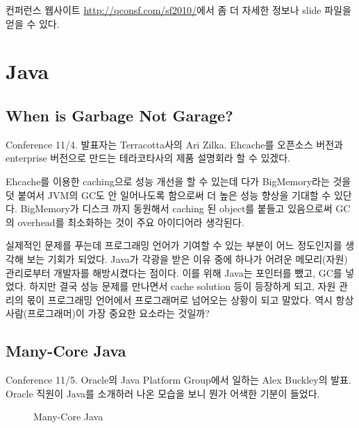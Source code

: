 \documentclass[11pt]{article}
\begin{document}
컨퍼런스 웹사이트 \url{http://qconsf.com/sf2010/}에서 좀 더 자세한 정보나 
slide 파일을 얻을 수 있다.


\section{Java}

\subsection{When is Garbage Not Garage?}
\label{sec:gc}

Conference 11/4. 발표자는 Terracotta사의 Ari Zilka.
Ehcache를 오픈소스 버전과 enterprise 버전으로 만드는 테라코타사의 제품 
설명회라 할 수 있겠다.
 
Ehcache를 이용한 caching으로 성능 개선을 할 수 있는데 다가
BigMemory라는 것을 덧 붙여서 JVM의 GC도 안 일어나도록 함으로써 더 높은
성능 향상을 기대할 수 있단다.
BigMemory가 디스크 까지 동원해서 caching 된 object를 붙들고 있음으로써
GC의 overhead를 최소화하는 것이 주요 아이디어라 생각된다.
 
실제적인 문제를 푸는데 프로그래밍 언어가 기여할 수 있는 부분이 어느 
정도인지를 생각해 보는 기회가 되었다.
Java가 각광을 받은 이유 중에 하나가 어려운 메모리(자원) 관리로부터 개발자를 
해방시켰다는 점이다. 이를 위해 Java는 포인터를 뺐고, GC를 넣었다. 
하지만 결국 성능 문제를 만나면서 cache solution 등이 등장하게 되고, 자원 
관리의 몫이 프로그래밍 언어에서 프로그래머로 넘어오는 상황이 되고 말았다.
역시 항상 사람(프로그래머)이 가장 중요한 요소라는 것일까?

\subsection{Many-Core Java}
\label{many core java}

Conference 11/5. Oracle의 Java Platform Group에서 일하는 Alex Buckley의 발표.
Oracle 직원이 Java를 소개하러 나온 모습을 보니 뭔가 어색한 기분이 들었다. 

\begin{figure}[t]
    \begin{Frame}
        \begin{center}
        \end{center}
    \end{Frame}
    \caption{Many-Core Java}
    \label{lambda}
\end{figure}
\end{document}
